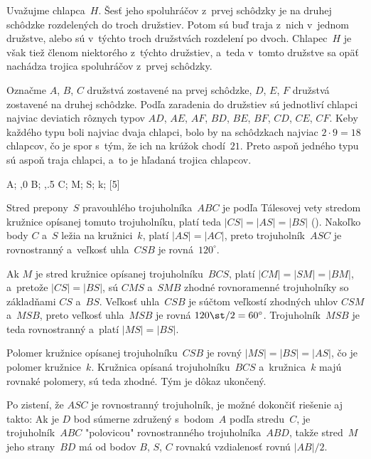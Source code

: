 {%
Uvažujme chlapca~$H$. Šesť jeho spoluhráčov z~prvej
schôdzky je na druhej schôdzke rozdelených do troch družstiev. Potom sú
buď traja z~nich v~jednom družstve, alebo sú v~týchto troch
družstvách rozdelení po dvoch. Chlapec~$H$ je však tiež členom
niektorého z~týchto družstiev, a~teda v~tomto družstve sa opäť
nachádza trojica spoluhráčov z~prvej schôdzky.

\ineriesenie
Označme $A$, $B$, $C$ družstvá zostavené na prvej
schôdzke, $D$, $E$, $F$ družstvá zostavené na druhej schôdzke. Podľa
zaradenia do družstiev sú jednotliví chlapci najviac deviatich rôznych
typov $AD$, $AE$, $AF$, $BD$, $BE$, $BF$, $CD$, $CE$, $CF$. Keby
každého typu boli najviac dvaja chlapci, bolo by na schôdzkach najviac
$2\cdot9=18$ chlapcov, čo je spor s~tým, že ich na krúžok
chodí~$21$. Preto aspoň jedného typu sú aspoň traja chlapci,
a~to je hľadaná trojica chlapcov.}

{%
\fontplace
\tpoint A; \tpoint{},0 B; \rbpoint{},.5 C;
\bpoint M; \rtpoint S;
\rBpoint k;
[5] \hfil\Obr

Stred prepony~$S$ pravouhlého trojuholníka~$ABC$ je podľa
Tálesovej vety stredom kružnice opísanej tomuto trojuholníku, platí
teda $|CS|=|AS|=|BS|$ (\obr). Nakoľko body $C$ a~$S$ ležia na
kružnici~$k$, platí $|AS|=|AC|$, preto trojuholník~$ASC$ je
rovnostranný a~veľkosť uhla~$CSB$ je rovná~$120^\circ$.

\inspicture

Ak $M$ je stred kružnice opísanej trojuholníku~$BCS$, platí
$|CM|=|SM|=|BM|$, a~pretože $|CS|=|BS|$, sú $CMS$ a~$SMB$ zhodné
rovnoramenné trojuholníky so základňami $CS$ a~$BS$. Veľkosť
uhla~$CSB$ je súčtom veľkostí zhodných uhlov $CSM$ a~$MSB$,
preto veľkosť uhla~$MSB$ je rovná $120\st/2=60^\circ$.
Trojuholník~$MSB$ je teda rovnostranný a~platí $|MS|=|BS|$.

Polomer kružnice opísanej trojuholníku~$CSB$ je rovný
$|MS|=|BS|=|AS|$, čo je polomer kružnice~$k$. Kružnica opísaná
trojuholníku~$BCS$ a~kružnica~$k$ majú rovnaké polomery, sú teda
zhodné. Tým je dôkaz ukončený.

\poznamka
Po zistení, že $ASC$ je rovnostranný
trojuholník, je možné dokončiť riešenie aj takto: Ak je $D$ bod
súmerne združený s~bodom~$A$ podľa stredu~$C$, je trojuholník~$ABC$
"polovicou" rovnostranného trojuholníka~$ABD$, takže stred~$M$
jeho strany~$BD$ má od bodov $B$, $S$, $C$ rovnakú vzdialenosť
rovnú $|AB|/2$.}

